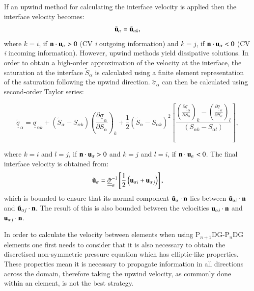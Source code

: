 \documentclass[preprint,authoryear,12pt]{elsarticle}
\newcommand{\frc}{\displaystyle\frac}
\begin{document}
If an upwind method for calculating the interface velocity is applied
then the interface velocity becomes:
\begin{equation}
  {\tilde{\bf u}}_{\alpha} = \tilde{\bf u}_{\alpha k},
\end{equation}
where $k=i$, if ${\bf n}\cdot{\bf u}_{\alpha}>0$ (CV {\it i} outgoing
information) and $k=j$, if ${\bf n}\cdot{\bf u}_{\alpha}<0$ (CV {\it
  i} incoming information). However, upwind methods yield dissipative
solutions. In order to obtain a high-order approximation of the
velocity at the interface, the saturation at the interface
$\tilde{S}_{\alpha}$ is calculated using a finite element
representation of the saturation following the upwind direction.
$\tilde \sigma_{\alpha}$ can then be calculated using second-order
Taylor series:
\begin{small}
\begin{equation}
  \underline{\underline{\tilde{\sigma}}}_{\alpha} =
  \underline{\underline{\sigma}}_{\alpha k} +
  \left(\tilde{S}_{\alpha}-S_{\alpha k}\right) \left(\frc{\partial
    \underline{\underline{\sigma}}_{\alpha}}{\partial
    S_{\alpha}}\right)_{k} +
  \frc{1}{2}\left(\tilde{S}_{\alpha}-S_{\alpha k}\right)^{2} \left[
    \frc{ \left(\frc{\partial
        \underline{\underline{\sigma}}_{\alpha}}{\partial
        S_{\alpha}}\right)_{k} - \left(\frc{\partial
        \underline{\underline{\sigma}}_{\alpha}}{\partial
        S_{\alpha}}\right)_{l} } { \left(S_{\alpha k}-S_{\alpha
        l}\right) } \right],
  \label{sigma-out}
\end{equation}
\end{small}
where $k=i$ and $l=j$, if ${\bf n}\cdot{\bf u}_{\alpha}>0$ and $k=j$
and $l=i$, if ${\bf n}\cdot{\bf u}_{\alpha}<0$. The final interface
velocity is obtained from:
\begin{equation}
  {\tilde{\bf u}_{\alpha}} =
  \underline{\underline{\tilde{\sigma}}}_{\alpha}^{-1}
  \left[\displaystyle\frac{1}{2} \left( {{\bf u}_\alpha}_i + {{\bf
        u}_\alpha}_j \right)\right],
  \label{mean_int_vel}  
\end{equation} 
which is bounded to ensure that its normal component ${\tilde{\bf
    u}_\alpha}\cdot {\bf n}$ lies between ${\tilde{\bf u}_{\alpha
    i}}\cdot {\bf n}$ and ${\tilde{\bf u}_{\alpha j}}\cdot {\bf
  n}$. The result of this is also bounded between the velocities
${{\bf u}_\alpha}_i\cdot {\bf n}$ and ${{\bf u}_\alpha}_j\cdot {\bf
  n}$.

In order to calculate the velocity between elements when using
P$_{n+1}$DG-P$_{n}$DG elements one first needs to consider that it is
also necessary to obtain the discretised non-symmetric pressure
equation which has elliptic-like properties. These properties mean it
is necessary to propagate information in all directions across the
domain, therefore taking the upwind velocity, as commonly done within
an element, is not the best strategy.
 
\end{document}
